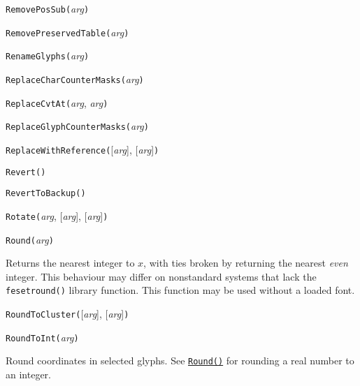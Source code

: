 \noindent\texttt{RemovePosSub(}\textit{arg}\texttt{)}


\noindent\texttt{RemovePreservedTable(}\textit{arg}\texttt{)}


\noindent\texttt{RenameGlyphs(}\textit{arg}\texttt{)}


\noindent\texttt{ReplaceCharCounterMasks(}\textit{arg}\texttt{)}


\noindent\texttt{ReplaceCvtAt(}\textit{arg}, \textit{arg}\texttt{)}


\noindent\texttt{ReplaceGlyphCounterMasks(}\textit{arg}\texttt{)}


\noindent\texttt{ReplaceWithReference(}[\textit{arg}], [\textit{arg}]\texttt{)}


\noindent\texttt{Revert(}\texttt{)}


\noindent\texttt{RevertToBackup(}\texttt{)}


\noindent\texttt{Rotate(}\textit{arg}, [\textit{arg}], [\textit{arg}]\texttt{)}


\noindent\texttt{Round(}\textit{arg}\texttt{)}

Returns the nearest integer to $x$, with ties broken by returning the
nearest \emph{even} integer.  This behaviour may differ on nonstandard
systems that lack the \texttt{fesetround()} library function.
This function may be used without a loaded font.


\noindent\texttt{RoundToCluster(}[\textit{arg}], [\textit{arg}]\texttt{)}


\noindent\texttt{RoundToInt(}\textit{arg}\texttt{)}

Round coordinates in selected glyphs.  See
\hyperref[func:Round]{\texttt{Round()}} for rounding a
real number to an integer.


